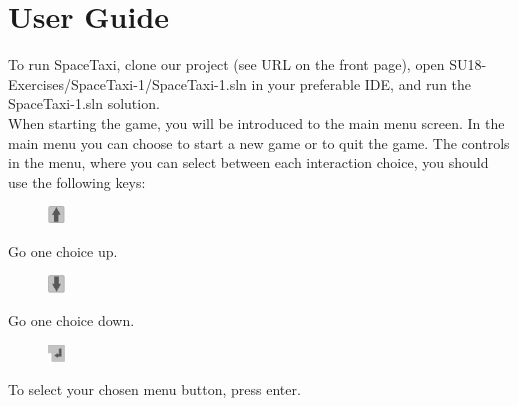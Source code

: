 \documentclass[../master.tex]{subfile}
\begin{document}
\section{User Guide}
To run SpaceTaxi, clone our project (see URL on the front page), open SU18-Exercises/SpaceTaxi-1/SpaceTaxi-1.sln in your preferable IDE, and run the SpaceTaxi-1.sln solution.\\

When starting the game, you will be introduced to the main menu screen. In the main menu you can choose to start a new game or to quit the game. The controls in the menu, where you can select between each interaction choice, you should use the following keys:\\
\begin{figure}
	\vspace{-6.9mm}
	\begin{centering}
		\includegraphics[width=0.04\textwidth]{./Pictures/Pil_op.png}
	\end{centering}
	\vspace{-6mm}
\end{figure}
Go one choice up.\\

\begin{figure}
	\vspace{-6.9mm}
	\begin{centering}
		\includegraphics[width=0.04\textwidth]{./Pictures/Pil_ned.png}
	\end{centering}
	\vspace{-6mm}
\end{figure}
Go one choice down.\\

\begin{figure}
	\vspace{-6.9mm}
	\begin{centering}
		\includegraphics[width=0.04\textwidth]{./Pictures/Enter.png}
	\end{centering}
	\vspace{-6mm}
\end{figure}
To select your chosen menu button, press enter.\\
\end{document}

